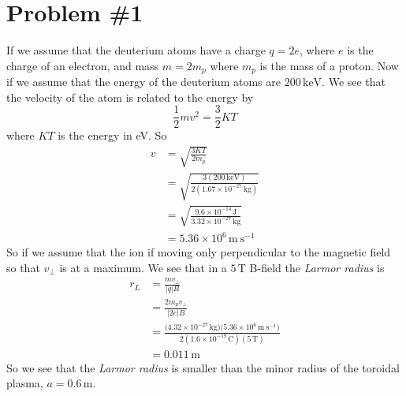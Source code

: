 \documentclass[11pt]{article}
\numberwithin{equation}{section}
\newcommand{\unit}[1]{\ensuremath{\, \mathrm{#1}}}
\begin{document}


\section{Problem \#1}
If we assume that the deuterium atoms have a charge $q=2e$, where $e$ is the charge of an electron, and mass $m=2m_p$ where $m_p$ is the mass of a proton. Now if we assume that the energy of the deuterium atoms are $200\unit{keV}$. We see that the velocity of the atom is related to the energy by
$$\frac{1}{2}mv^2 = \frac{3}{2}KT$$
where $KT$ is the energy in eV. So
\begin{align*}
v &= \sqrt{\frac{3KT}{2m_p}}\\
&= \sqrt{\frac{3(200\unit{keV})}{2(1.67\times10^{-27}\unit{kg})}}\\
&= \sqrt{\frac{9.6\times10^{-14}\unit{J}}{3.32\times10^{-27}\unit{kg}}}\\
&= 5.36\times10^{6}\unit{m\ s^{-1}}
\end{align*}
So if we assume that the ion if moving only perpendicular to the magnetic field so that $v_{\perp}$ is at a maximum. We see that in a $5\unit{T}$ B-field the \emph{Larmor radius} is
\begin{align*} 
r_L &= \frac{mv_{\perp}}{|q|B}\\
&= \frac{2m_pv_{\perp}}{|2e|B}\\
&= \frac{({4.32\times10^{-27}\unit{kg})(5.36\times10^{6}\unit{m\ s^{-1})}}}{2(1.6\times10^{-19}\unit{C})(5\unit{T})}\\
&= 0.011\unit{m}
\end{align*} 
So we see that the \emph{Larmor radius} is smaller than the minor radius of the toroidal plasma, $a=0.6\unit{m}$.
\end{document}
